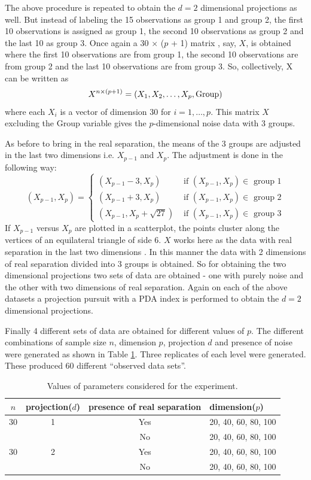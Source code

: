 \documentclass[12]{article}
\begin{document}
The above procedure is repeated to obtain the $d = 2$ dimensional projections as well. But instead of labeling the 15 observations as group 1 and group 2, the first 10 observations is assigned as group 1, the second 10 observations as group 2 and the last 10 as group 3. Once again a 30 $\times$ ($p$ + 1) matrix , say, $X$, is obtained where the first 10 observations are from group 1, the second 10 observations are from group 2 and the last 10 observations are from group 3.  So, collectively, X can be written as
$$X^{n \times (p + 1)} = (X_1, X_2, \dots, X_p, \hbox{Group})$$ where each $X_i$ is a vector of dimension 30 for $i = 1, \dots, p$. This matrix $X$ excluding the Group variable gives the $p$-dimensional noise data with 3 groups.

As before to bring in the real separation, the means of the 3 groups are adjusted in the last two dimensions i.e. $X_{p-1}$ and $X_p$. The adjustment is done in the following way:
$$
(X_{p-1}, X_p) = \left\{ \begin{array}{rl}
 (X_{p-1} - 3, X_p) &\mbox{ if $(X_{p-1}, X_p) \in$ group 1} \\
 (X_{p-1} + 3, X_p) &\mbox{ if $(X_{p-1}, X_p) \in$ group 2} \\
 (X_{p-1} , X_p + \sqrt{27}) &\mbox{ if $(X_{p-1}, X_p) \in$ group 3}
       \end{array} \right.
$$
If $X_{p-1}$ versus $X_p$ are plotted in a scatterplot, the points cluster along the vertices of an equilateral triangle of side 6. $X$ works here as the data with real separation in the last two dimensions . In this manner the data with 2 dimensions of real separation divided into 3 groups is obtained. 
So for obtaining the two dimensional projections two sets of data are obtained - one with purely noise and the other with two dimensions of real separation. Again on each of the above datasets a projection pursuit with a PDA index is performed to obtain the $d = 2$ dimensional projections. 

Finally 4 different sets of data are obtained for different values of $p$. The different combinations of sample size $n$, dimension $p$, projection $d$ and presence of noise were generated as shown in Table \ref{freq}. Three replicates of each level were generated. These produced 60 different ``observed data sets''. 

\begin{table}[htbp]
\begin{center}
\caption{Values of parameters considered for the experiment.}
\begin{tabular}{cccp{3cm}}
  \hline
  \hline
  $n$ & projection($d$) & presence of real separation & dimension($p$) \\
  \hline
  30 & 1 & Yes & 20, 40, 60, 80, 100 \\
      & & No & 20, 40, 60, 80, 100\\
   30 & 2 & Yes & 20, 40, 60, 80, 100 \\
     & & No & 20, 40, 60, 80, 100\\   
      \hline
\end{tabular}
\label{freq}
\end{center}
\end{table}
\end{document}
